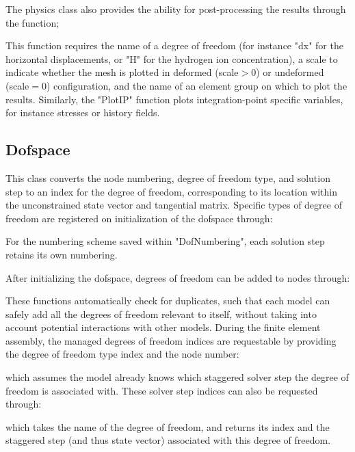 \documentclass[3p]{elsarticle} %
\begin{document}
The physics class also provides the ability for post-processing the results through the function;

This function requires the name of a degree of freedom (for instance "dx" for the horizontal displacements, or "H" for the hydrogen ion concentration), a scale to indicate whether the mesh is plotted in deformed (scale$>$0) or undeformed (scale$=$0) configuration, and the name of an element group on which to plot the results. Similarly, the "PlotIP" function plots integration-point specific variables, for instance stresses or history fields.

\subsection{Dofspace}
This class converts the node numbering, degree of freedom type, and solution step to an index for the degree of freedom, corresponding to its location within the unconstrained state vector and tangential matrix. Specific types of degree of freedom are registered on initialization of the dofspace through:

For the numbering scheme saved within "DofNumbering", each solution step retains its own numbering. 

After initializing the dofspace, degrees of freedom can be added to nodes through:

These functions automatically check for duplicates, such that each model can safely add all the degrees of freedom relevant to itself, without taking into account potential interactions with other models. During the finite element assembly, the managed degrees of freedom indices are requestable by providing the degree of freedom type index and the node number:

which assumes the model already knows which staggered solver step the degree of freedom is associated with. These solver step indices can also be requested through:

which takes the name of the degree of freedom, and returns its index and the staggered step (and thus state vector) associated with this degree of freedom.
\end{document}
